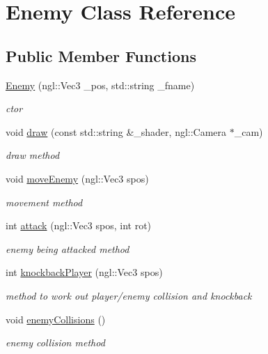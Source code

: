 \hypertarget{class_enemy}{\section{Enemy Class Reference}
\label{class_enemy}
}
\subsection*{Public Member Functions}
\begin{DoxyCompactItemize}
\item 
\hyperlink{class_enemy_a2d1b1a14c8df3df8b230c1ae38e1e193}{Enemy} (ngl\-::\-Vec3 \-\_\-pos, std\-::string \-\_\-fname)
\begin{DoxyCompactList}\small\item\em ctor \end{DoxyCompactList}\item 
void \hyperlink{class_enemy_ae7e82c8a3afd8b39ab3947fa1ece3394}{draw} (const std\-::string \&\-\_\-shader, ngl\-::\-Camera $\ast$\-\_\-cam)
\begin{DoxyCompactList}\small\item\em draw method \end{DoxyCompactList}\item 
void \hyperlink{class_enemy_a1a3c17dff184c23dfcc1f4ec499f7b36}{move\-Enemy} (ngl\-::\-Vec3 spos)
\begin{DoxyCompactList}\small\item\em movement method \end{DoxyCompactList}\item 
int \hyperlink{class_enemy_ab572397c421fd9dda7491360d53741ca}{attack} (ngl\-::\-Vec3 spos, int rot)
\begin{DoxyCompactList}\small\item\em enemy being attacked method \end{DoxyCompactList}\item 
int \hyperlink{class_enemy_a83b9d3f2d42c6abc0a9759fb59cd93b5}{knockback\-Player} (ngl\-::\-Vec3 spos)
\begin{DoxyCompactList}\small\item\em method to work out player/enemy collision and knockback \end{DoxyCompactList}\item 
\hypertarget{class_enemy_a533fe9819e7a304caaa51938590a49ff}{void \hyperlink{class_enemy_a533fe9819e7a304caaa51938590a49ff}{enemy\-Collisions} ()}\label{class_enemy_a533fe9819e7a304caaa51938590a49ff}

\begin{DoxyCompactList}\small\item\em enemy collision method \end{DoxyCompactList}\end{DoxyCompactItemize}
